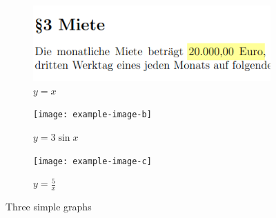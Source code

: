 \documentclass{article}
\begin{document}
\begin{figure}
    \centering
    \begin{subfigure}[b]{0.3\textwidth}
        \centering
        \includegraphics[width=\textwidth]{img/miete_chg.png}
        \caption{$y = x$}
        \label{fig:y_equals_x}
    \end{subfigure}
    \hfill
    \begin{subfigure}[b]{0.3\textwidth}
        \centering
        \texttt{[image: example-image-b]}
        \caption{$y = 3\sin x$}
        \label{fig:three_sin_x}
    \end{subfigure}
    \hfill
    \begin{subfigure}[b]{0.3\textwidth}
        \centering
        \texttt{[image: example-image-c]}
        \caption{$y = \frac{5}{x}$}
        \label{fig:five_over_x}
    \end{subfigure}
    \caption{Three simple graphs}
    \label{fig:three_graphs}
\end{figure}
\end{document}
